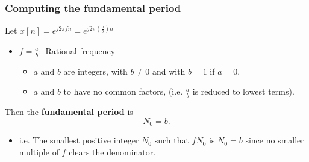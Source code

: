     \subsubsection{Computing the fundamental period}
    \begin{definition}
         Let \( x[n] = e^{j 2 \pi f n} = e^{j 2 \pi \left( \frac{a}{b} \right) n}\) 
         \begin{itemize}
            \item \( f = \frac{a}{b}: \) Rational frequency
            \begin{itemize}
                \item \(a\) and \(b\) are integers, with \(b \neq 0\) and with \(b = 1\) if \(a = 0\). 
                \item \(a\) and \(b\) to have no common factors, (i.e. \(\frac{a}{b}\) is reduced to lowest terms).
            \end{itemize}
         \end{itemize}
         \vspace{1em}
         Then the \textbf{fundamental period} is 
            \[
            N_0 = b.
            \]
        \begin{itemize}
            \item i.e. The smallest positive integer \(N_0\) such that \(fN_0\) is $N_0 =b$ since no smaller multiple of \(f\) clears the denominator.
        \end{itemize}
    \end{definition}



